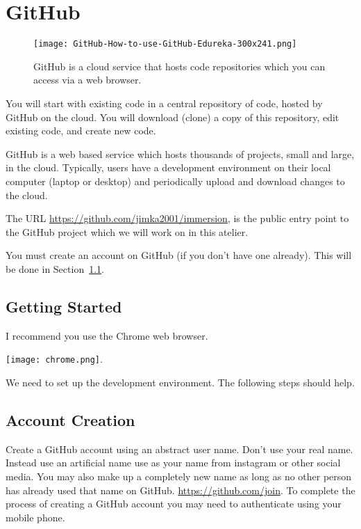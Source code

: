 \section{GitHub}
\label{sec.github}

\begin{figure}[h]
  \centering
  \texttt{[image: GitHub-How-to-use-GitHub-Edureka-300x241.png]}
  \caption{GitHub is a cloud service that hosts code repositories which 
    you can access via a web browser.}
\end{figure}


You will start with existing code in a central repository of code, hosted by
GitHub on the cloud.  You will download (clone) a copy of this
repository, edit existing code, and create new code.

GitHub is a web based service which hosts thousands of projects, small
and large, in the cloud.  Typically, users have a development
environment on their local computer (laptop or desktop) and
periodically upload and download changes to the cloud.

The URL \url{https://github.com/jimka2001/immersion}, is the public
entry point to the GitHub project which we will work on in this
atelier.

You must create an account on GitHub (if you don't have one already).
This will be done in Section~\ref{sec.setup}.


\subsection{Getting Started}
\label{sec.setup}

I recommend you use the Chrome web browser.

\texttt{[image: chrome.png]}.

We need to set up the development environment.  The following steps should
help.

\subsection{Account Creation}
  
Create a GitHub account using an abstract user name.  Don't use your
real name.  Instead use an artificial name use as your name from
instagram or other social media.  You may also make up a completely
new name as long as no other person has already used that name on
GitHub.  \url{https://github.com/join}.  To complete the process of
creating a GitHub account you may need to authenticate using your
mobile phone.


